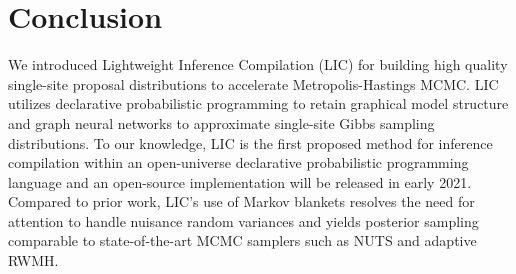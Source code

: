 \documentclass[../../thesis.tex]{subfiles}
\begin{document}
\section{Conclusion}

We introduced Lightweight Inference Compilation (LIC) for building high
quality single-site proposal distributions to accelerate Metropolis-Hastings
MCMC. LIC utilizes declarative probabilistic programming to retain graphical
model structure and graph neural networks to approximate single-site Gibbs
sampling distributions. To our knowledge, LIC is the first proposed method
for inference compilation within an open-universe declarative probabilistic
programming language and an open-source implementation will be released in
early 2021. Compared to prior work, LIC's use of Markov blankets resolves the
need for attention to handle nuisance random variances and yields posterior
sampling comparable to state-of-the-art MCMC samplers such as NUTS and
adaptive RWMH.


% 
\end{document}
